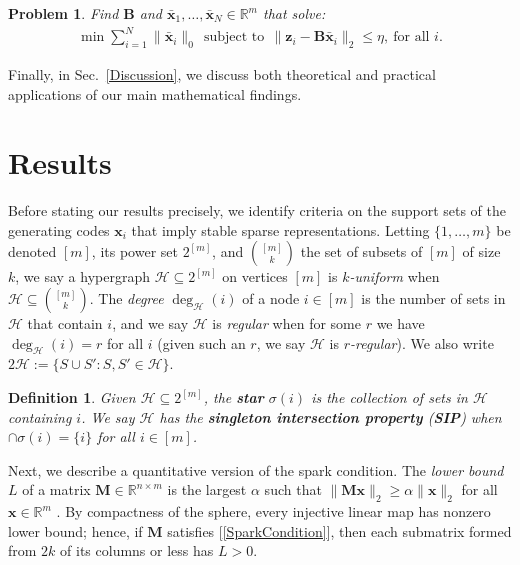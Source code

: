 \documentclass[9pt,twocolumn]{pnas-new}
\newtheorem{problem}{Problem}
\newtheorem{definition}{Definition}
\renewcommand{\eqref}[1]{\textnormal{[\ref{#1}]}}
\begin{document}
\begin{problem}\label{OptimizationProblem}
Find $\mathbf{B}$ and \mbox{$\mathbf{\bar x}_1, \ldots, \mathbf{\bar x}_N \in \mathbb{R}^m$} that solve:
\begin{align}\label{minsum}
\min \sum_{i = 1}^N \|\mathbf{\bar x}_i\|_0 \ \ 
\text{subject to} \ \ \|\mathbf{z}_i - \mathbf{B}\mathbf{\bar x}_i\|_2 \leq \eta, \ \text{for all $i$}.
\end{align}
\end{problem}
Finally, in Sec.~\ref{Discussion}, we discuss both theoretical and practical applications of our main mathematical findings.

\section{Results}\label{Results}

Before stating our results precisely, we identify criteria on the support sets of the generating codes $\mathbf{x}_i$ that imply stable sparse representations. Letting $\{1, \ldots, m\}$ be denoted $[m]$, its power set $2^{[m]}$, and ${[m] \choose k}$ the set of subsets of $[m]$ of size $k$, we say a hypergraph $\mathcal{H} \subseteq 2^{[m]}$ on vertices $[m]$ is \textit{$k$-uniform} when $\mathcal{H} \subseteq {[m] \choose k}$. The \emph{degree} $\deg_\mathcal{H}(i)$ of a node $i \in [m]$ is the number of sets in $\mathcal{H}$ that contain $i$, and we say $\mathcal{H}$ is \emph{regular} when for some $r$ we have $\deg_\mathcal{H}(i) = r$ for all $i$ (given such an $r$, we say $\mathcal{H}$ is \textit{$r$-regular}). We also write $2\mathcal{H} := \{ S \cup S': S, S' \in \mathcal{H}\}$.

\begin{definition}\label{sip}
Given $\mathcal{H} \subseteq 2^{[m]}$, the \textbf{star} $\sigma(i)$ is the collection of sets in $\mathcal{H}$ containing $i$. We say $\mathcal{H}$ has the \textbf{singleton intersection property} (\textbf{SIP}) when $\cap \sigma(i) = \{i\}$ for all $i \in [m]$.
\end{definition}

Next, we describe a quantitative version of the spark condition. The \emph{lower bound} $L$ of a matrix $\mathbf{M} \in \mathbb R^{n \times m}$ is the largest $\alpha$ such that \mbox{$\|\mathbf{M}\mathbf{x}\|_2 \geq \alpha\|\mathbf{x}\|_2$} for all $\mathbf{x} \in \mathbb{R}^m$ \cite{Grcar10}. By compactness of the sphere, every injective linear map has nonzero lower bound; hence, if $\mathbf{M}$ satisfies \eqref{SparkCondition}, then each submatrix formed from $2k$ of its columns or less has $L > 0$. 
\end{document}
